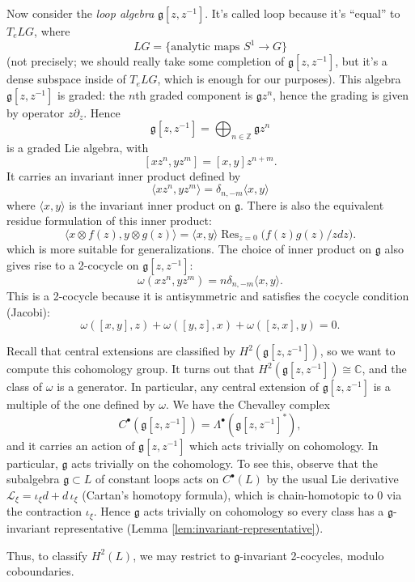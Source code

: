 \documentclass[12pt]{article}
\begin{document}
Now consider the \emph{loop algebra} $\mathfrak{g}[z,z^{-1}]$. It's called loop because it's “equal” to $T_e LG$, where
\[
    LG = \{\text{analytic maps } S^1 \to G\}
\]
(not precisely; we should really take some completion of $\mathfrak{g}[z,z^{-1}]$, but it's a dense subspace inside of $T_e LG$, which is enough for our purposes). This algebra $\mathfrak{g}[z,z^{-1}]$ is graded: the $n$th graded component is $\mathfrak{g} z^n$, hence the grading is given by operator $z\partial_z$. Hence
\[
    \mathfrak{g}[z,z^{-1}] = \bigoplus_{n \in \mathbb{Z}} \mathfrak{g}z^n
\]
is a graded Lie algebra, with
\[
    [xz^n, yz^m] = [x,y] z^{n+m}.
\]
It carries an invariant inner product defined by
\[
    \langle xz^n, yz^m \rangle = \delta_{n,-m} \langle x,y \rangle
\] where $\langle x,y \rangle$ is the invariant inner product on $\mathfrak{g}$. There is also the equivalent residue formulation of this inner product:
\[
    \langle x\otimes f(z), y\otimes g(z) \rangle = \langle x,y \rangle \operatorname{Res}_{z=0}\bigg(f(z)g(z)/z dz\bigg).
\] which is more suitable for generalizations. The choice of inner product on $\mathfrak{g}$ also gives rise to a 2-cocycle on $\mathfrak{g}[z,z^{-1}]$:
\[
    \omega(xz^n, yz^m) = n \delta_{n,-m} \langle x,y \rangle.
\]
This is a 2-cocycle because it is antisymmetric and satisfies the cocycle condition (Jacobi):
\[
    \omega([x,y],z) + \omega([y,z],x) + \omega([z,x],y) = 0.
\]

Recall that central extensions are classified by $H^2(\mathfrak{g}[z,z^{-1}])$, so we want to compute this cohomology group. It turns out that $H^2(\mathfrak{g}[z,z^{-1}]) \cong \mathbb{C}$, and the class of $\omega$ is a generator. In particular, any central extension of $\mathfrak{g}[z,z^{-1}]$ is a multiple of the one defined by $\omega$. We have the Chevalley complex
\[
    C^\bullet(\mathfrak{g}[z,z^{-1}]) = \Lambda^\bullet(\mathfrak{g}[z,z^{-1}]^*),
\]
and it carries an action of $\mathfrak{g}[z,z^{-1}]$ which acts trivially on cohomology. In particular, $\mathfrak{g}$ acts trivially on the cohomology.
To see this, observe that the subalgebra $\mathfrak g\subset L$ of constant loops acts on $C^\bullet(L)$ by the usual Lie derivative
$\mathcal L_\xi = \iota_\xi d + d\,\iota_\xi$ (Cartan's homotopy formula), which is chain-homotopic to 0 via the contraction $\iota_\xi$.
Hence $\mathfrak g$ acts trivially on cohomology so every class has a $\mathfrak g$-invariant representative (Lemma \ref{lem:invariant-representative}).

Thus, to classify $H^2(L)$, we may restrict to $\mathfrak g$-invariant 2-cocycles, modulo coboundaries.
\end{document}
